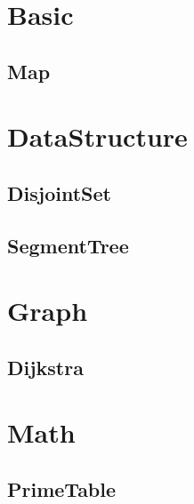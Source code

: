 \section{Basic}
\subsection{Map}


\section{DataStructure}
\subsection{DisjointSet}

\subsection{SegmentTree}


\section{Graph}
\subsection{Dijkstra}


\section{Math}
\subsection{PrimeTable}





